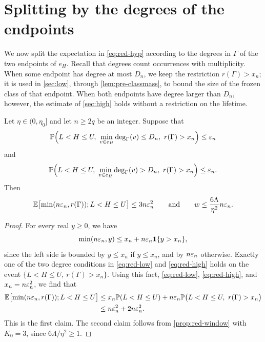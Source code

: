 \section{Splitting by the degrees of the endpoints}\label{sec:red-split}

We now split the expectation in \eqref{eq:red-hyp} according to the degrees in $\Gamma$ of the two endpoints of $e_H$. Recall that degrees count occurrences with multiplicity. When some endpoint has degree at most $D_n$, we keep the restriction $r(\Gamma) > x_n$; it is used in \cref{sec:low}, through \cref{lem:pre-classmass}, to bound the size of the frozen class of that endpoint. When both endpoints have degree larger than $D_n$, however, the estimate of \cref{sec:high} holds without a restriction on the lifetime.

\begin{proposition}\label{prop:red-split}
Let $\eta \in (0, \eta_0]$ and let $n \ge 2q$ be an integer. Suppose that
\begin{equation}\label{eq:red-low}
\Pp\Bigl(L < H \le U, \ \min_{v \in e_H} \deg_\Gamma(v) \le D_n, \ r(\Gamma) > x_n\Bigr) \le \eps_n
\end{equation}
and
\begin{equation}\label{eq:red-high}
\Pp\Bigl(L < H \le U, \ \min_{v \in e_H} \deg_\Gamma(v) > D_n, \ r(\Gamma) > x_n\Bigr) \le \eps_n.
\end{equation}
Then
\begin{equation*}
\mathbb E\bigl[\min(n \varepsilon_n, r(\Gamma)); L < H \le U\bigr] \le 3 n \varepsilon_n^2 \qquad \text{and} \qquad w \le \frac{6 \Lambda}{\eta^2} n \varepsilon_n.
\end{equation*}
\end{proposition}

\begin{proof}
For every real $y \ge 0$, we have
\begin{equation*}
\min(n \varepsilon_n, y) \le x_n + n \varepsilon_n \mathbf 1\{y > x_n\},
\end{equation*}
since the left side is bounded by $y \le x_n$ if $y \le x_n$, and by $n \varepsilon_n$ otherwise. Exactly one of the two degree conditions in \eqref{eq:red-low} and \eqref{eq:red-high} holds on the event $\{L < H \le U, \ r(\Gamma) > x_n\}$. Using this fact, \eqref{eq:red-low}, \eqref{eq:red-high}, and $x_n = n \varepsilon_n^2$, we find that
\begin{equation*}
\begin{split}
\mathbb E\bigl[\min(n \varepsilon_n, r(\Gamma)); L < H \le U\bigr] &\le x_n \mathbb P(L < H \le U) + n \varepsilon_n \mathbb P\bigl(L < H \le U, \ r(\Gamma) > x_n\bigr) \\
&\le n \varepsilon_n^2 + 2 n \varepsilon_n^2.
\end{split}
\end{equation*}
This is the first claim. The second claim follows from \cref{prop:red-window} with $K_0 = 3$, since $6 \Lambda/\eta^2 \ge 1$.
\end{proof}


